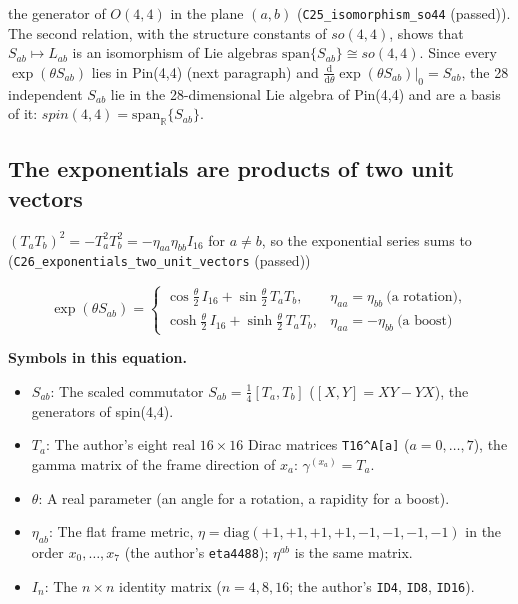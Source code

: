 \documentclass[
  10pt,
]{article}
\providecommand{\tightlist}{%
  \setlength{\itemsep}{0pt}\setlength{\parskip}{0pt}}
\begin{document}
the generator of \(O(4,4)\) in the plane \((a, b)\)
(\texttt{C25\_isomorphism\_so44} (passed)). The second relation, with
the structure constants of \(so(4,4)\), shows that
\(S_{ab} \mapsto L_{ab}\) is an isomorphism of Lie algebras
\(\mathrm{span}\{S_{ab}\} \cong so(4,4)\). Since every
\(\exp(\theta S_{ab})\) lies in Pin(4,4) (next paragraph) and
\(\tfrac{\mathrm{d}}{\mathrm{d}\theta}\exp(\theta S_{ab})|_0 = S_{ab}\),
the 28 independent \(S_{ab}\) lie in the 28-dimensional Lie algebra of
Pin(4,4) and are a basis of it:
\(spin(4,4) = \mathrm{span}_{\mathbb R}\{S_{ab}\}\).

\hypertarget{the-exponentials-are-products-of-two-unit-vectors}{%
\subsection{The exponentials are products of two unit
vectors}\label{the-exponentials-are-products-of-two-unit-vectors}}

\((T_aT_b)^2 = -T_a^2T_b^2 = -\eta_{aa}\eta_{bb}I_{16}\) for
\(a \ne b\), so the exponential series sums to
(\texttt{C26\_exponentials\_two\_unit\_vectors} (passed))

\[
\exp(\theta S_{ab}) = \begin{cases} \cos\tfrac\theta2\,I_{16} + \sin\tfrac\theta2\,T_aT_b, & \eta_{aa} = \eta_{bb}\ \text{(a rotation)},\\ \cosh\tfrac\theta2\,I_{16} + \sinh\tfrac\theta2\,T_aT_b, & \eta_{aa} = -\eta_{bb}\ \text{(a boost)} \end{cases}
\]

\textbf{Symbols in this equation.}

\begin{itemize}
\tightlist
\item
  \(S_{ab}\): The scaled commutator \(S_{ab} = \tfrac14[T_a, T_b]\)
  (\([X, Y] = XY - YX\)), the generators of spin(4,4).
\item
  \(T_a\): The author's eight real \(16 \times 16\) Dirac matrices
  \texttt{T16\^{}A{[}a{]}} (\(a = 0, \dots, 7\)), the gamma matrix of
  the frame direction of \(x_a\): \(\gamma^{(x_a)} = T_a\).
\item
  \(\theta\): A real parameter (an angle for a rotation, a rapidity for
  a boost).
\item
  \(\eta_{ab}\): The flat frame metric,
  \(\eta = \mathrm{diag}(+1, +1, +1, +1, -1, -1, -1, -1)\) in the order
  \(x_0, \dots, x_7\) (the author's \texttt{eta4488}); \(\eta^{ab}\) is
  the same matrix.
\item
  \(I_n\): The \(n \times n\) identity matrix (\(n = 4, 8, 16\); the
  author's \texttt{ID4}, \texttt{ID8}, \texttt{ID16}).
\end{itemize}
\end{document}
